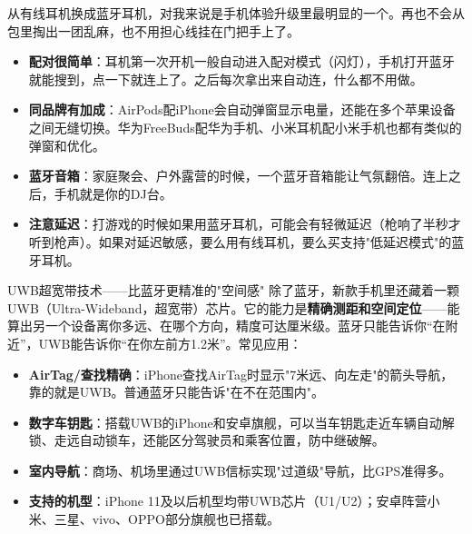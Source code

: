 
从有线耳机换成蓝牙耳机，对我来说是手机体验升级里最明显的一个。再也不会从包里掏出一团乱麻，也不用担心线挂在门把手上了。

\begin{itemize}
  \item \textbf{配对很简单}：耳机第一次开机一般自动进入配对模式（闪灯），手机打开蓝牙就能搜到，点一下就连上了。之后每次拿出来自动连，什么都不用做。
  \item \textbf{同品牌有加成}：AirPods配iPhone会自动弹窗显示电量，还能在多个苹果设备之间无缝切换。华为FreeBuds配华为手机、小米耳机配小米手机也都有类似的弹窗和优化。
  \item \textbf{蓝牙音箱}：家庭聚会、户外露营的时候，一个蓝牙音箱能让气氛翻倍。连上之后，手机就是你的DJ台。
  \item \textbf{注意延迟}：打游戏的时候如果用蓝牙耳机，可能会有轻微延迟（枪响了半秒才听到枪声）。如果对延迟敏感，要么用有线耳机，要么买支持"低延迟模式"的蓝牙耳机。
\end{itemize}

\begin{tcbinfo}{UWB超宽带技术——比蓝牙更精准的"空间感"}
除了蓝牙，新款手机里还藏着一颗UWB（Ultra-Wideband，超宽带）芯片。它的能力是\textbf{精确测距和空间定位}——能算出另一个设备离你多远、在哪个方向，精度可达厘米级。蓝牙只能告诉你“在附近”，UWB能告诉你“在你左前方1.2米”。常见应用：

\begin{itemize}
  \item \textbf{AirTag/查找精确}：iPhone查找AirTag时显示"7米远、向左走"的箭头导航，靠的就是UWB。普通蓝牙只能告诉"在不在范围内"。
  \item \textbf{数字车钥匙}：搭载UWB的iPhone和安卓旗舰，可以当车钥匙走近车辆自动解锁、走远自动锁车，还能区分驾驶员和乘客位置，防中继破解。
  \item \textbf{室内导航}：商场、机场里通过UWB信标实现"过道级"导航，比GPS准得多。
  \item \textbf{支持的机型}：iPhone 11及以后机型均带UWB芯片（U1/U2）；安卓阵营小米、三星、vivo、OPPO部分旗舰也已搭载。
\end{itemize}

\end{tcbinfo}

